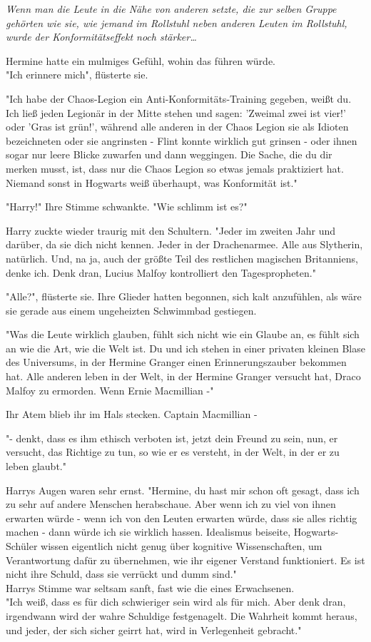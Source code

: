 {\emph{Wenn man die Leute in die Nähe von anderen setzte, die zur selben Gruppe gehörten wie sie, wie jemand im Rollstuhl neben anderen Leuten im Rollstuhl, wurde der Konformitätseffekt noch stärker…}

Hermine hatte ein mulmiges Gefühl, wohin das führen würde.\\ "Ich erinnere mich", flüsterte sie.

"Ich habe der Chaos-Legion ein Anti-Konformitäts-Training gegeben, weißt du. Ich ließ jeden Legionär in der Mitte stehen und sagen: 'Zweimal zwei ist vier!' oder 'Gras ist grün!', während alle anderen in der Chaos Legion sie als Idioten bezeichneten oder sie angrinsten - Flint konnte wirklich gut grinsen - oder ihnen sogar nur leere Blicke zuwarfen und dann weggingen. Die Sache, die du dir merken musst, ist, dass nur die Chaos Legion so etwas jemals praktiziert hat. Niemand sonst in Hogwarts weiß überhaupt, was Konformität ist."

"Harry!" Ihre Stimme schwankte. "Wie schlimm ist es?"

Harry zuckte wieder traurig mit den Schultern. "Jeder im zweiten Jahr und darüber, da sie dich nicht kennen. Jeder in der Drachenarmee. Alle aus Slytherin, natürlich. Und, na ja, auch der größte Teil des restlichen magischen Britanniens, denke ich. Denk dran, Lucius Malfoy kontrolliert den Tagespropheten."

"Alle?", flüsterte sie. Ihre Glieder hatten begonnen, sich kalt anzufühlen, als wäre sie gerade aus einem ungeheizten Schwimmbad gestiegen.

"Was die Leute wirklich glauben, fühlt sich nicht wie ein Glaube an, es fühlt sich an wie die Art, wie die Welt ist. Du und ich stehen in einer privaten kleinen Blase des Universums, in der Hermine Granger einen Erinnerungszauber bekommen hat. Alle anderen leben in der Welt, in der Hermine Granger versucht hat, Draco Malfoy zu ermorden. Wenn Ernie Macmillian -"

Ihr Atem blieb ihr im Hals stecken. Captain Macmillian -

"- denkt, dass es ihm ethisch verboten ist, jetzt dein Freund zu sein, nun, er versucht, das Richtige zu tun, so wie er es versteht, in der Welt, in der er zu leben glaubt."

Harrys Augen waren sehr ernst. "Hermine, du hast mir schon oft gesagt, dass ich zu sehr auf andere Menschen herabschaue. Aber wenn ich zu viel von ihnen erwarten würde - wenn ich von den Leuten erwarten würde, dass sie alles richtig machen - dann würde ich sie wirklich hassen. Idealismus beiseite, Hogwarts-Schüler wissen eigentlich nicht genug über kognitive Wissenschaften, um Verantwortung dafür zu übernehmen, wie ihr eigener Verstand funktioniert. Es ist nicht ihre Schuld, dass sie verrückt und dumm sind."\\ Harrys Stimme war seltsam sanft, fast wie die eines Erwachsenen.\\ "Ich weiß, dass es für dich schwieriger sein wird als für mich. Aber denk dran, irgendwann wird der wahre Schuldige festgenagelt. Die Wahrheit kommt heraus, und jeder, der sich sicher geirrt hat, wird in Verlegenheit gebracht."

}
